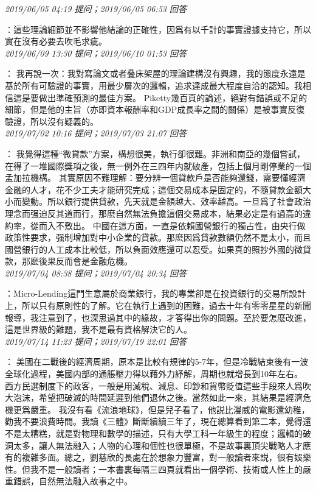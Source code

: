\documentclass[twocolumn]{ctexart}
\begin{document}
\textit{\hfill\noindent\small 2019/06/05 04:19 提问；2019/06/05 06:53 回答}

：這些理論細節並不影響他結論的正確性，因爲有以千計的事實證據支持它，所以實在沒有必要去吹毛求疵。
\\

\textit{\hfill\noindent\small 2019/06/09 13:30 提问；2019/06/10 01:53 回答}

：
我再說一次：我對寫論文或者叠床架屋的理論建構沒有興趣，我的態度永遠是基於所有可驗證的事實，用最少層次的邏輯，追求達成最大程度自洽的認知。我相信這是要做出準確預測的最佳方案。
Piketty幾百頁的論述，絕對有錯誤或不足的細節，但是他的主旨（亦即資本報酬率和GDP成長率之間的關係）是被事實反復驗證，所以沒有疑義的。
\\

\textit{\hfill\noindent\small 2019/07/02 10:16 提问；2019/07/03 21:07 回答}

：
我覺得這種“微貸款”方案，構想很美，執行卻很難。非洲和南亞的幾個嘗試，在得了一堆國際獎項之後，無一例外在三四年内就破產，包括上個月剛停業的一個孟加拉機構。
其實原因不難理解：要分辨一個貸款戶是否能夠還錢，需要懂經濟金融的人才，花不少工夫才能研究完成；這個交易成本是固定的，不隨貸款金額大小而變動。所以銀行提供貸款，先天就是金額越大、效率越高。一旦爲了社會政治理念而强迫反其道而行，那麽自然無法負擔這個交易成本，結果必定是有過高的違約率，從而入不敷出。
中國在這方面，一直是依賴國營銀行的獨占性，由央行做政策性要求，强制增加對中小企業的貸款。那麽因爲貸款數額仍然不是太小，而且國營銀行的人工成本比較低，所以負面效應還可以忍受。如果真的照抄外國的微貸款，那麽後果反而會是金融危機。
\\

\textit{\hfill\noindent\small 2019/07/04 08:38 提问；2019/07/04 20:34 回答}

：Micro-Lending這門生意屬於商業銀行，我的專業卻是在投資銀行的交易所設計上，所以只有原則性的了解。它在執行上遇到的困難，過去十年有零零星星的新聞報導，我注意到了，也深思過其中的緣故，才答得出你的問題。至於要怎麼改進，這是世界級的難題，我不是最有資格解決它的人。
\\

\textit{\hfill\noindent\small 2019/07/14 11:23 提问；2019/07/19 22:01 回答}

：
美國在二戰後的經濟周期，原本是比較有規律的5-7年，但是冷戰結束後有一波全球化過程，美國内部的通脹壓力得以藉外力紓解，周期也就增長到10年左右。 
西方民選制度下的政客，一般是用減稅、減息、印鈔和貨幣貶值這些手段來人爲吹大泡沫，希望把破滅的時間延遲到他們退休之後。當然如此一來，其結果是經濟危機更爲嚴重。 
我沒有看《流浪地球》，但是兒子看了，他説比漫威的電影還幼稚，勸我不要浪費時間。我讀《三體》斷斷續續三年了，現在總算看到第二本，覺得還不是太糟糕，就是對物理和數學的描述，只有大學工科一年級生的程度；邏輯的破洞太多，讓人無法融入；人物的心理和個性也很單極，不是故事裏頂尖戰略人才應有的複雜多面。總之，劉慈欣的長處在於想象力豐富，對一般讀者來説，很有娛樂性。但我不是一般讀者；一本書裏每隔三四頁就看出一個學術、技術或人性上的嚴重錯誤，自然無法融入故事之中。
\\
\end{document}
